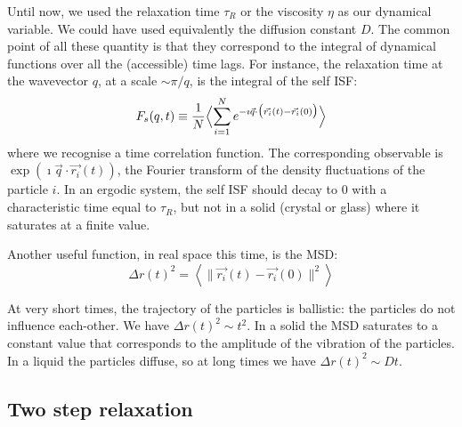 Until now, we used the relaxation time $\tau_R$ or the viscosity $\eta$ as our dynamical variable. We could have used equivalently the diffusion constant $D$. The common point of all these quantity is that they correspond to the integral of dynamical functions over all the (accessible) time lags. For instance, the relaxation time at the wavevector $q$,  at a scale $\sim \pi/q$, is the integral of the self \ac{ISF}:
\begin{equation}
	F_s(q,t) \equiv \frac{1}{N} \Bigl\langle\sum_{i=1}^N e^{-\imath\vec{q}\cdot\bigl(\vec{r_i}(t)-\vec{r_i}(0)\bigr)}\Bigr\rangle
	\label{eq:isf}
\end{equation}
where we recognise a time correlation function. The corresponding observable is $\exp{\left(\imath\vec{q} \cdot \vec{r_i}(t)\right)}$, the Fourier transform of the density fluctuations of the particle $i$. In an ergodic system, the self \ac{ISF} should decay to $0$ with a characteristic time equal to $\tau_R$, but not in a solid (crystal or glass) where it saturates at a finite value.

Another useful function, in real space this time, is the \ac{MSD}:
\begin{equation}
	\Delta r(t)^2 = \left\langle\| \vec{r_i}(t)-\vec{r_i}(0)\|^2\right\rangle
	\label{eq:msd}
\end{equation}

At very short times, the trajectory of the particles is ballistic: the particles do not influence each-other. We have $\Delta r(t)^2 \sim t^2$. In a solid the \ac{MSD} saturates to a constant value that corresponds to the amplitude of the vibration of the particles. In a liquid the particles diffuse, so at long times we have $\Delta r(t)^2 \sim D t$.

\subsection{Two step relaxation}
\label{sec:2steps}


